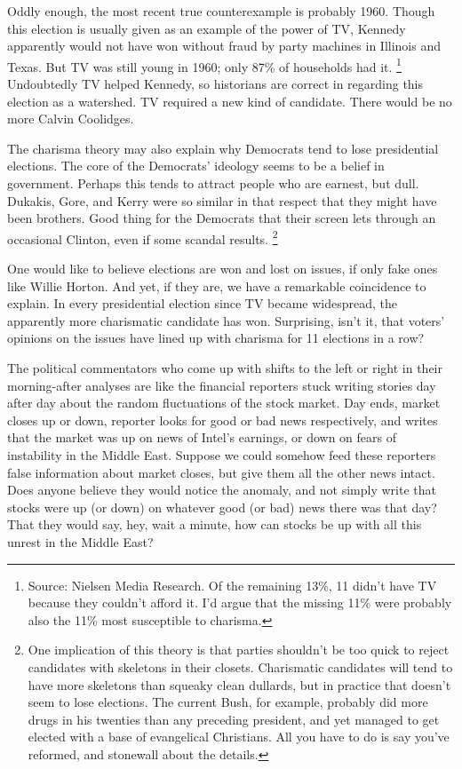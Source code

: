 \documentclass[12pt]{book}
\begin{document}
Oddly enough, the most recent true counterexample is probably 1960.
Though this election is usually given as an example of the power of TV,
Kennedy apparently would not have won without fraud by party machines in
Illinois and Texas. But TV was still young in 1960; only 87\% of
households had it. \footnote{Source: Nielsen Media Research. Of the remaining 13\%, 11 didn't
have TV because they couldn't afford it. I'd argue that the missing 11\%
were probably also the 11\% most susceptible to charisma.} Undoubtedly TV helped
Kennedy, so historians are correct in regarding this election as a
watershed. TV required a new kind of candidate. There would be no more
Calvin Coolidges.

The charisma theory may also explain why Democrats tend to lose
presidential elections. The core of the Democrats' ideology seems to be
a belief in government. Perhaps this tends to attract people who are
earnest, but dull. Dukakis, Gore, and Kerry were so similar in that
respect that they might have been brothers. Good thing for the Democrats
that their screen lets through an occasional Clinton, even if some
scandal results. \footnote{One implication of this theory is that parties shouldn't be too
quick to reject candidates with skeletons in their closets. Charismatic
candidates will tend to have more skeletons than squeaky clean dullards,
but in practice that doesn't seem to lose elections. The current Bush,
for example, probably did more drugs in his twenties than any preceding
president, and yet managed to get elected with a base of evangelical
Christians. All you have to do is say you've reformed, and stonewall
about the details.}

One would like to believe elections are won and lost on issues, if only
fake ones like Willie Horton. And yet, if they are, we have a remarkable
coincidence to explain. In every presidential election since TV became
widespread, the apparently more charismatic candidate has won.
Surprising, isn't it, that voters' opinions on the issues have lined up
with charisma for 11 elections in a row?

The political commentators who come up with shifts to the left or right
in their morning-after analyses are like the financial reporters stuck
writing stories day after day about the random fluctuations of the stock
market. Day ends, market closes up or down, reporter looks for good or
bad news respectively, and writes that the market was up on news of
Intel's earnings, or down on fears of instability in the Middle East.
Suppose we could somehow feed these reporters false information about
market closes, but give them all the other news intact. Does anyone
believe they would notice the anomaly, and not simply write that stocks
were up (or down) on whatever good (or bad) news there was that day?
That they would say, hey, wait a minute, how can stocks be up with all
this unrest in the Middle East?
\end{document}

